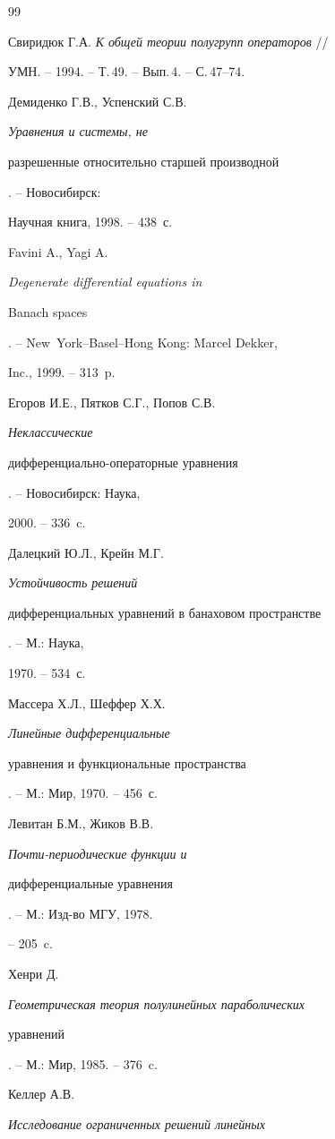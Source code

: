 \begin{thebibliography}{99}







Свиридюк Г.А. {\it К общей теории полугрупп операторов} //


УМН. -- 1994. -- Т.\,49. -- Вып.\,4. -- С.\,47--74.




Демиденко Г.В., Успенский С.В. {\it Уравнения и системы, не


разрешенные относительно старшей производной}. -- Новосибирск:


Научная книга, 1998. -- 438~с.




Favini A., Yagi A. {\it Degenerate differential equations in


Banach spaces}. -- New~York--Basel--Hong Kong: Marcel Dekker,


Inc., 1999. -- 313~p.




Егоров И.Е., Пятков С.Г., Попов С.В. {\it Неклассические


дифференциально-операторные уравнения}. -- Новосибирск: Наука,


2000. -- 336~c.




Далецкий Ю.Л., Крейн М.Г. {\it Устойчивость решений


дифференциальных уравнений в банаховом пространстве}. -- М.: Наука,


1970. -- 534~с.




Массера Х.Л., Шеффер Х.Х. {\it Линейные дифференциальные


уравнения и функциональные пространства}. -- М.: Мир, 1970. -- 456~с.




Левитан Б.М., Жиков В.В. {\it Почти-периодические функции и


дифференциальные уравнения}. -- М.: Изд-во МГУ, 1978.


-- 205~c.




Хенри Д. {\it Геометрическая теория полулинейных параболических


уравнений}. -- М.: Мир, 1985. -- 376~c.




Келлер А.В. {\it Исследование ограниченных решений линейных


}
\end{thebibliography}
